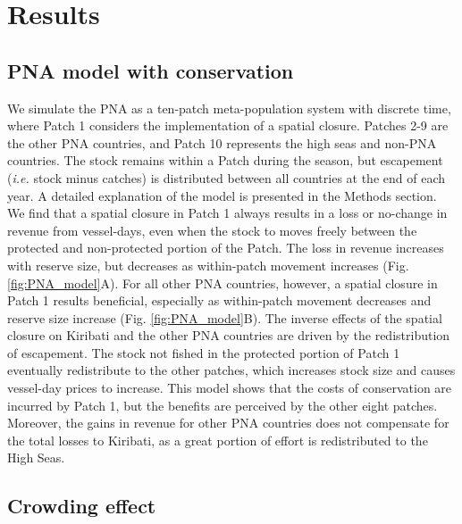 \documentclass[9p,twocolumn,twoside,lineno]{pnas-new}
\begin{document}
\section{Results}\label{results}

\subsection{PNA model with conservation}

We simulate the PNA as a ten-patch meta-population system with discrete time, where Patch 1 considers the implementation of a spatial closure. Patches 2-9 are the other PNA countries, and Patch 10 represents the high seas and non-PNA countries. The stock remains within a Patch during the season, but escapement (\emph{i.e.} stock minus catches) is distributed between all countries at the end of each year. A detailed explanation of the model is presented in the Methods section. We find that a spatial closure in Patch 1 always results in a loss or no-change in revenue from vessel-days, even when the stock to moves freely between the protected and non-protected portion of the Patch. The loss in revenue increases with reserve size, but decreases as within-patch movement increases (Fig. \ref{fig:PNA_model}A). For all other PNA countries, however, a spatial closure in Patch 1 results beneficial, especially as within-patch movement decreases and reserve size increase (Fig. \ref{fig:PNA_model}B). The inverse effects of the spatial closure on Kiribati and the other PNA countries are driven by the redistribution of escapement. The stock not fished in the protected portion of Patch 1 eventually redistribute to the other patches, which increases stock size and causes vessel-day prices to increase. This model shows that the costs of conservation are incurred by Patch 1, but the benefits are perceived by the other eight patches. Moreover, the gains in revenue for other PNA countries does not compensate for the total losses to Kiribati, as a great portion of effort is redistributed to the High Seas.

\subsection{Crowding effect}
\end{document}
